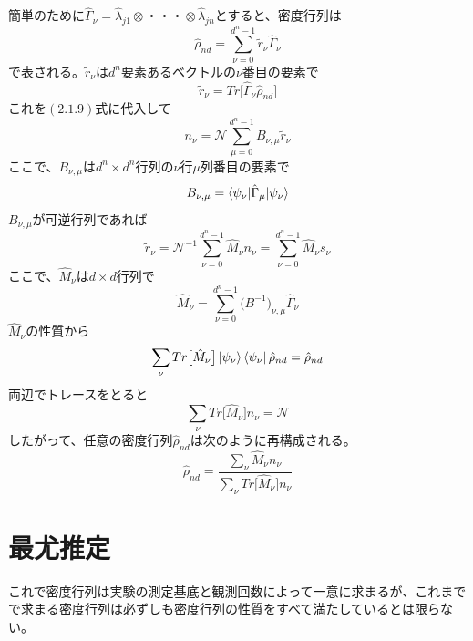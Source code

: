\documentclass[11pt,a4j,notitlepage]{jreport}
\begin{document}
	簡単のために$\hat{\Gamma}_\nu = \hat{\lambda}_{j 1} \otimes ・・・ \otimes \hat{\lambda}_{j n}$とすると、密度行列は
	\begin{equation}
		\hat{\rho}_{n d} = \sum_{\nu = 0}^{d^n - 1} \tilde{r}_\nu \hat{\Gamma}_\nu
	\end{equation}
	で表される。$\tilde{r}_\nu$は$d^n$要素あるベクトルの$\nu$番目の要素で
	\begin{equation}
		\tilde{r}_\nu = Tr \big[ \hat{\Gamma}_\nu \hat{\rho}_{n d} \big]
	\end{equation}
	これを$(2.1.9)$式に代入して
	\begin{equation}
		n_\nu = \mathcal{N} \sum_{\mu = 0}^{d^n - 1} B_{\nu, \mu} \tilde{r}_\nu
	\end{equation}
	ここで、$B_{\nu, \mu}$は$d^n \times d^n$行列の$\nu$行$\mu$列番目の要素で
	\begin{equation}
		B_{\nu, \mu} = \braket{\psi_\nu | \hat{\Gamma}_\mu | \psi_\nu}
	\end{equation}
	$B_{\nu, \mu}$が可逆行列であれば
	\begin{equation}
		\tilde{r}_\nu = \mathcal{N}^{-1} \sum_{\nu = 0}^{d^n - 1} \hat{M}_\nu n_\nu = \sum_{\nu = 0}^{d^n - 1} \hat{M}_\nu s_\nu
	\end{equation}
	ここで、$\hat{M}_\nu$は$d \times d$行列で
	\begin{equation}
		\hat{M}_\nu = \sum_{\nu = 0}^{d^n - 1} \big( B^{-1} \big)_{\nu, \mu} \hat{\Gamma}_\nu
	\end{equation}
	$\hat{M}_\nu$の性質から
	\begin{equation}
		\sum_\nu Tr \big[ \hat{M}_\nu \big] \ket{\psi_\nu} \bra{\psi_\nu} \hat{\rho}_{n d} = \hat{\rho}_{n d}
	\end{equation}
	両辺でトレースをとると
	\begin{equation}
		\sum_\nu Tr \big[ \hat{M}_\nu \big] n_\nu = \mathcal{N}
	\end{equation}
	したがって、任意の密度行列$\hat{\rho}_{n d}$は次のように再構成される。
	\begin{equation}
		\hat{\rho}_{n d} = \frac{\sum_\nu \hat{M}_\nu n_\nu}{\sum_\nu Tr \big[ \hat{M}_\nu \big] n_\nu} 
	\end{equation}


	\section{最尤推定}

	これで密度行列は実験の測定基底と観測回数によって一意に求まるが、これまでで求まる密度行列は必ずしも密度行列の性質をすべて満たしているとは限らない。
\end{document}

